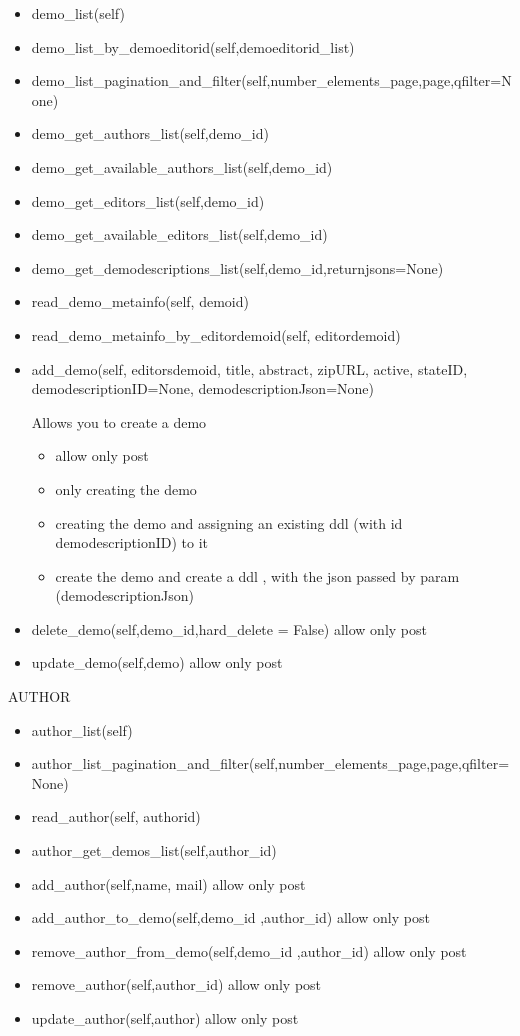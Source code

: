 \begin{itemize}
\item  demo\_list(self)
\item  demo\_list\_by\_demoeditorid(self,demoeditorid\_list)
\item  demo\_list\_pagination\_and\_filter(self,number\_elements\_page,page,qfilter=None)
\item  demo\_get\_authors\_list(self,demo\_id)
\item  demo\_get\_available\_authors\_list(self,demo\_id)
\item  demo\_get\_editors\_list(self,demo\_id)
\item  demo\_get\_available\_editors\_list(self,demo\_id)
\item  demo\_get\_demodescriptions\_list(self,demo\_id,returnjsons=None)
\item  read\_demo\_metainfo(self, demoid)
\item  read\_demo\_metainfo\_by\_editordemoid(self, editordemoid)
\item  add\_demo(self, editorsdemoid, title, abstract, zipURL, active, stateID, demodescriptionID=None, demodescriptionJson=None)

    Allows you to create a demo
    \begin{itemize}
        \item allow only post
        \item only creating the demo
        \item creating the demo and assigning an existing ddl (with id demodescriptionID) to it
        \item create the demo and create a ddl , with the json passed by param (demodescriptionJson)
    \end{itemize}

\item  delete\_demo(self,demo\_id,hard\_delete = False)
allow only post
\item  update\_demo(self,demo)
allow only post
\end{itemize}


AUTHOR

\begin{itemize}
\item  author\_list(self)
\item  author\_list\_pagination\_and\_filter(self,number\_elements\_page,page,qfilter=None)
\item  read\_author(self, authorid)
\item  author\_get\_demos\_list(self,author\_id)
\item  add\_author(self,name, mail)
allow only post
\item  add\_author\_to\_demo(self,demo\_id ,author\_id)
allow only post
\item  remove\_author\_from\_demo(self,demo\_id ,author\_id)
allow only post
\item  remove\_author(self,author\_id)
allow only post
\item  update\_author(self,author)
allow only post
\end{itemize}


